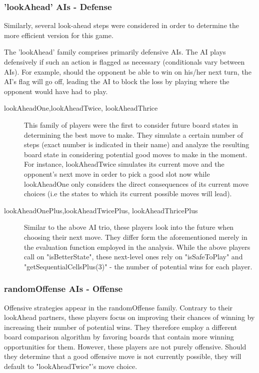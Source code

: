 \documentclass[11pt]{article}
\begin{document}
\subsubsection{'lookAhead' AIs - Defense}
Similarly, several look-ahead steps were considered in order to determine the more efficient version for this game. 

The 'lookAhead' family comprises primarily defensive AIs. The AI plays defensively if such an action is flagged as necessary (conditionals vary between AIs). For example, should the opponent be able to win on his/her next turn, the AI's flag will go off, leading the AI to block the loss by playing where the opponent would have had to play.

\begin{description}
\item[lookAheadOne,lookAheadTwice, lookAheadThrice] This family of players were the first to consider future board states in determining the best move to make. They simulate a certain number of steps (exact number is indicated in their name) and analyze the resulting board state in considering potential good moves to make in the moment. For instance, lookAheadTwice simulates its current move and the opponent's next move in order to pick a good slot now while lookAheadOne only considers the direct consequences of its current move choices (i.e the states to which its current possible moves will lead).

\item[lookAheadOnePlus,lookAheadTwicePlus, lookAheadThricePlus] Similar to the above AI trio, these players look into the future when choosing their next move. They differ form the aforementioned merely in the evaluation function employed in the analysis. While the above players call on "isBetterState", these next-level ones rely on "isSafeToPlay" and "getSequentialCellsPlus(3)" - the number of potential wins for each player.

\end{description}

\subsubsection{randomOffense AIs - Offense}
Offensive strategies appear in the randomOffense family. Contrary to their lookAhead partners, these players focus on improving their chances of winning by increasing their number of potential wins. They therefore employ a different board comparison algorithm by favoring boards that contain more winning opportunities for them. However, these players are not purely offensive. Should they determine that a good offensive move is not currently possible, they will default to "lookAheadTwice"'s move choice.
\end{document}
